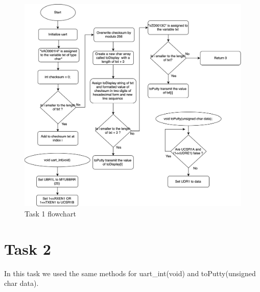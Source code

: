 \documentclass[a4paper,12pt]{article}
\begin{document}
\break
\begin{figure}
\begin{center}
\includegraphics[width=\textwidth/1 ]{flowchart/task1_flowchart.png}
\end{center}
\caption{Task 1 flowchart}
\label{task1}
\end{figure}



\section{Task 2}
In this task we used the same methods for uart\_int(void) and toPutty(unsigned char data). 
\lstset{style=CStyle}
\end{document}
